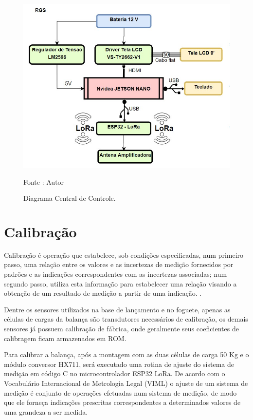 \begin{figure}[H]
  \centering
  \includegraphics[scale=0.6]{figuras/Maleta_Diagrama.jpg}
  \caption{Diagrama Central de Controle. } 
  {\footnotesize Fonte : Autor } 
  \label{fig:CentraldeCOntrole}
\end{figure}

\section{Calibração}

\par Calibração é operação que estabelece, sob condições especificadas, num primeiro passo, uma relação entre os valores e as incertezas de medição fornecidos por padrões e as indicações correspondentes com as incertezas associadas; num segundo passo, utiliza esta informação para estabelecer uma relação visando a obtenção de um resultado de medição a partir de uma indicação. \cite{VIM_CALIBRACAO}.

\par Dentre os sensores utilizados na base de lançamento e no foguete, apenas as células de cargas da balança são transdutores necessários de calibração, os demais sensores já possuem calibração de fábrica, onde geralmente seus coeficientes de calibragem ficam armazenados em ROM.

\par Para calibrar a balança, após a montagem com as duas células de carga 50 Kg e o módulo conversor HX711, será executado uma rotina de ajuste do sistema de medição em código C no microcontrolador ESP32 LoRa. De acordo com o Vocabulário Internacional de Metrologia Legal (VIML) o ajuste de um sistema de medição é conjunto de operações efetuadas num sistema de medição, de modo que ele forneça indicações prescritas correspondentes a determinados valores de uma grandeza a ser medida. 

